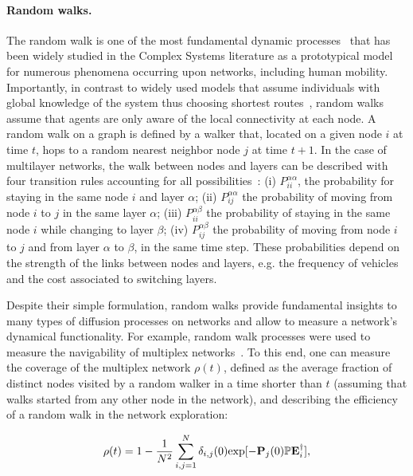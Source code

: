 \paragraph{Random walks.}
The random walk is one of the most fundamental dynamic processes~\cite{sole2016random} that has been widely studied in the Complex Systems literature as a prototypical model for numerous phenomena occurring upon networks, including human mobility. Importantly, in contrast to widely used models that assume individuals with global knowledge of the system thus choosing shortest routes~\cite{wardrop1952road}, random walks assume that agents are only aware of the local connectivity at each node. A random walk on a graph is defined by a walker that, located on a given node $i$ at time $t$, hops to a random nearest neighbor node $j$ at time $t + 1$. In the case of multilayer networks, the walk between nodes and layers can be described with four transition rules accounting for all possibilities~\cite{dedomenico2014interconnected}: (i) $P_{ii}^{\alpha\alpha}$, the probability for staying in the same node $i$ and layer $\alpha$; (ii) $P_{ij}^{\alpha\alpha}$ the probability of moving from node $i$ to $j$ in the same layer $\alpha$; (iii) $P_{ii}^{\alpha\beta}$ the probability of staying in the same node $i$ while changing to layer $\beta$; (iv) $P_{ij}^{\alpha\beta}$ the probability of moving from node $i$ to $j$ and from layer $\alpha$ to $\beta$, in the same time step. These probabilities depend on the strength of the links between nodes and layers, e.g. the frequency of vehicles and the cost associated to switching layers. 

Despite their simple formulation, random walks provide fundamental insights to many types of diffusion processes on networks and allow to measure a network's dynamical functionality. For example, random walk processes were used to measure the navigability of multiplex networks~\cite{dedomenico2014interconnected}. To this end, one can measure the coverage of the multiplex network $\rho(t)$, defined as the average fraction of distinct nodes visited by a random walker in a time shorter than $t$ (assuming that walks started from any other node in the network), and describing the efficiency of a random walk in the network exploration:

\begin{equation}\label{coverage}
    \rho(t)=1-\\\frac{1}{N^2}\sum_{i,j=1}^{N}\delta_{i,j}(0)\text{exp}[-\mathbf{P}_j(0)\mathbb{P}\mathbf{E}_i^{\dagger}],
\end{equation}

